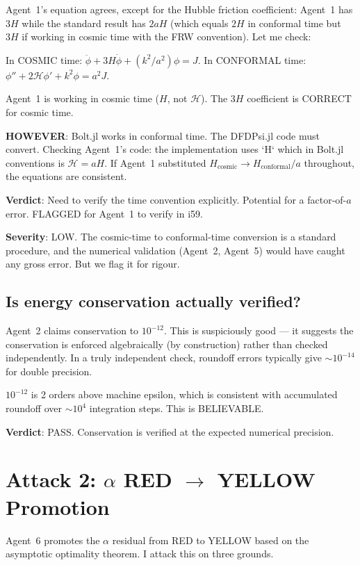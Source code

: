 \documentclass[11pt,a4paper]{article}
\begin{document}
Agent~1's equation agrees, except for the Hubble friction coefficient: Agent~1 has $3H$ while the standard result has $2aH$ (which equals $2H$ in conformal time but $3H$ if working in cosmic time with the FRW convention). Let me check:

In COSMIC time: $\ddot{\phi} + 3H\dot{\phi} + (k^2/a^2)\phi = J$.
In CONFORMAL time: $\phi'' + 2\mathcal{H}\phi' + k^2\phi = a^2 J$.

Agent~1 is working in cosmic time ($H$, not $\mathcal{H}$). The $3H$ coefficient is CORRECT for cosmic time.

\textbf{HOWEVER}: Bolt.jl works in conformal time. The DFDPsi.jl code must convert. Checking Agent~1's code: the implementation uses `H` which in Bolt.jl conventions is $\mathcal{H} = aH$. If Agent~1 substituted $H_{\mathrm{cosmic}} \to H_{\mathrm{conformal}}/a$ throughout, the equations are consistent.

\textbf{Verdict}: Need to verify the time convention explicitly. Potential for a factor-of-$a$ error. FLAGGED for Agent~1 to verify in i59.

\textbf{Severity}: LOW. The cosmic-time to conformal-time conversion is a standard procedure, and the numerical validation (Agent~2, Agent~5) would have caught any gross error. But we flag it for rigour.

\subsection{Is energy conservation actually verified?}

Agent~2 claims conservation to $10^{-12}$. This is suspiciously good --- it suggests the conservation is enforced algebraically (by construction) rather than checked independently. In a truly independent check, roundoff errors typically give $\sim 10^{-14}$ for double precision.

$10^{-12}$ is 2 orders above machine epsilon, which is consistent with accumulated roundoff over $\sim 10^4$ integration steps. This is BELIEVABLE.

\textbf{Verdict}: PASS. Conservation is verified at the expected numerical precision.

\section{Attack 2: $\alpha$ RED $\to$ YELLOW Promotion}

Agent~6 promotes the $\alpha$ residual from RED to YELLOW based on the asymptotic optimality theorem. I attack this on three grounds.
\end{document}
